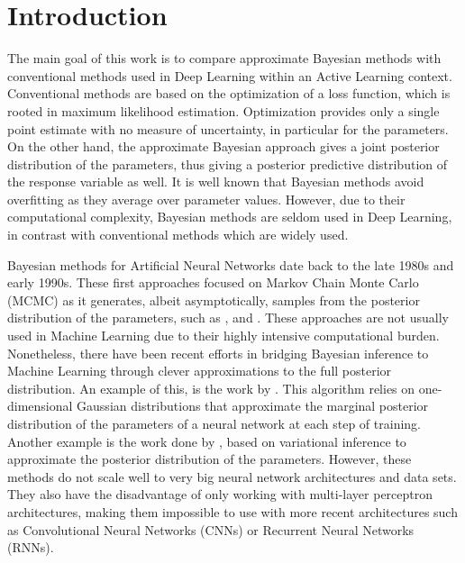 
\chapter{Introduction}
\label{ch:intro}

The main goal of this work is to compare approximate Bayesian methods with conventional methods used in Deep Learning within an Active Learning context. Conventional methods are based on the optimization of a loss function, which is rooted in maximum likelihood estimation. Optimization provides only a single point estimate with no measure of uncertainty, in particular for the parameters. On the other hand, the approximate Bayesian approach gives a joint posterior distribution of the parameters, thus giving a posterior predictive distribution of the response variable as well. It is well known that Bayesian methods avoid overfitting as they average over parameter values. However, due to their computational complexity, Bayesian methods are seldom used in Deep Learning, in contrast with conventional methods which are widely used.

Bayesian methods for Artificial Neural Networks date back to the late 1980s and early 1990s. These first approaches focused on Markov Chain Monte Carlo (MCMC) as
it generates, albeit asymptotically, samples from the posterior distribution
of the parameters, such as \citeauthor{neal1996bayesian} \cite{neal1996bayesian}, \citeauthor{denker1991transforming} \cite{denker1991transforming} and \citeauthor{mackay1992practical} \cite{mackay1992practical}.
These approaches are not usually used in Machine Learning due to their highly intensive computational burden.
Nonetheless, there have been recent efforts in bridging Bayesian inference to Machine Learning through clever approximations to the full posterior distribution. An example of this, is the work by \citeauthor{hernandez2015probabilistic} \cite{hernandez2015probabilistic}.
This algorithm relies on one-dimensional Gaussian distributions that approximate the marginal posterior distribution of the parameters of a neural network at each step of training.
Another example is the work done by \citeauthor{graves2011practical} \cite{graves2011practical}, based on variational inference to approximate the posterior distribution of the parameters. However, these methods do not scale well to very big neural network architectures and data sets. They also have the disadvantage of only working with multi-layer perceptron architectures, making them impossible to use with more recent architectures such as Convolutional Neural Networks (CNNs) or Recurrent Neural Networks (RNNs).

